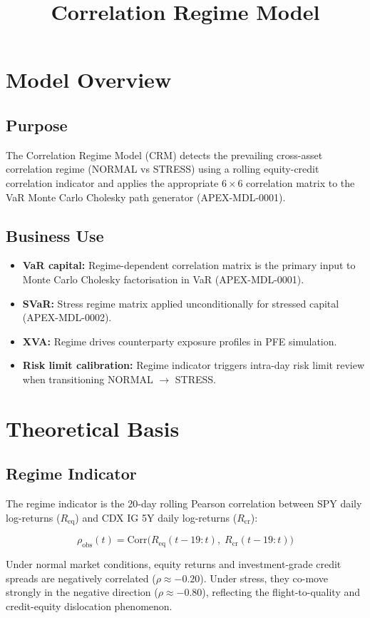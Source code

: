 \documentclass{apex_mdd}
\title{Correlation Regime Model}
\begin{document}
\maketitle
\statusbadge

\tableofcontents
\newpage

\section{Model Overview}

\subsection{Purpose}
The Correlation Regime Model (CRM) detects the prevailing cross-asset correlation regime (NORMAL vs STRESS) using a rolling equity-credit correlation indicator and applies the appropriate $6 \times 6$ correlation matrix to the VaR Monte Carlo Cholesky path generator (APEX-MDL-0001).

\subsection{Business Use}
\begin{itemize}
  \item \textbf{VaR capital:} Regime-dependent correlation matrix is the primary input to Monte Carlo Cholesky factorisation in VaR (APEX-MDL-0001).
  \item \textbf{SVaR:} Stress regime matrix applied unconditionally for stressed capital (APEX-MDL-0002).
  \item \textbf{XVA:} Regime drives counterparty exposure profiles in PFE simulation.
  \item \textbf{Risk limit calibration:} Regime indicator triggers intra-day risk limit review when transitioning NORMAL $\to$ STRESS.
\end{itemize}

\section{Theoretical Basis}

\subsection{Regime Indicator}
The regime indicator is the 20-day rolling Pearson correlation between SPY daily log-returns ($R_{\mathrm{eq}}$) and CDX IG 5Y daily log-returns ($R_{\mathrm{cr}}$):
\begin{formulabox}
\[
  \rho_{\mathrm{obs}}(t) = \mathrm{Corr}\bigl(R_{\mathrm{eq}}(t-19:t),\;R_{\mathrm{cr}}(t-19:t)\bigr)
\]
\end{formulabox}
Under normal market conditions, equity returns and investment-grade credit spreads are negatively correlated ($\rho \approx -0.20$). Under stress, they co-move strongly in the negative direction ($\rho \approx -0.80$), reflecting the flight-to-quality and credit-equity dislocation phenomenon.
\end{document}
